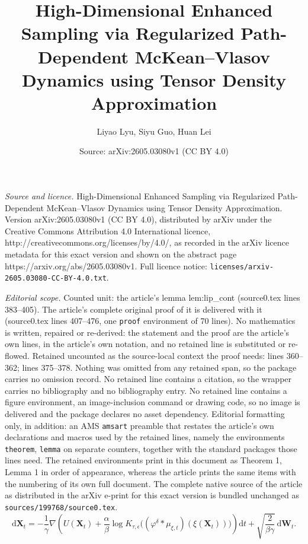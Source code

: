 \documentclass[10pt,a4paper]{amsart}
\title{High-Dimensional Enhanced Sampling via Regularized Path-Dependent McKean--Vlasov Dynamics using Tensor Density Approximation}
\author{Liyao Lyu, Siyu Guo, Huan Lei}
\date{Source: arXiv:2605.03080v1 (CC BY 4.0)}
\def\bW{\mathbf{W}}
\def\bX{\mathbf{X}}
\def\intd{\mathrm{d}}
\begin{document}
\maketitle

\noindent\emph{Source and licence.} High-Dimensional Enhanced Sampling via Regularized Path-Dependent McKean--Vlasov Dynamics using Tensor Density Approximation. Version arXiv:2605.03080v1 (CC BY 4.0), distributed by arXiv under the Creative Commons Attribution 4.0 International licence, http://creativecommons.org/licenses/by/4.0/, as recorded in the arXiv licence metadata for this exact version and shown on the abstract page https://arxiv.org/abs/2605.03080v1. Full licence notice: \texttt{licenses/arxiv-2605.03080-CC-BY-4.0.txt}.\par\smallskip

\noindent\textit{Editorial scope.} Counted unit: the article's lemma lem:lip\_cont (source0.tex lines 383--405). The article's complete original proof of it is delivered with it (source0.tex lines 407--476, one \texttt{proof} environment of 70 lines). No mathematics is written, repaired or re-derived: the statement and the proof are the article's own lines, in the article's own notation, and no retained line is substituted or re-flowed.  Retained uncounted as the source-local context the proof needs: lines 360--362; lines 375--378.  Nothing was omitted from any retained span, so the package carries no omission record.  No retained line contains a citation, so the wrapper carries no bibliography and no bibliography entry.  No retained line contains a figure environment, an image-inclusion command or drawing code, so no image is delivered and the package declares no asset dependency.  Editorial formatting only, in addition: an AMS \texttt{amsart} preamble that restates the article's own declarations and macros used by the retained lines, namely the environments \texttt{theorem}, \texttt{lemma} on separate counters, together with the standard packages those lines need.  The retained environments print in this document as Theorem 1, Lemma 1 in order of appearance, whereas the article prints the same items with the numbering of its own full document.  The complete native source of the article as distributed in the arXiv e-print for this exact version is bundled unchanged as \texttt{sources/199768/source0.tex}.
\begin{equation}\label{equ:regularized_MV_x}
    \intd \bX_t = -\frac{1}{\gamma}\nabla\!\left(U(\bX_t) + \frac{\alpha}{\beta}\log K_{\tau,\epsilon}\!\bigl((\varphi^\delta * \mu_{\xi,t})(\xi(\bX_t))\bigr)\right) \intd t + \sqrt{\frac{2}{\beta\gamma}}\,\intd \bW_t.
\end{equation}
\end{document}
